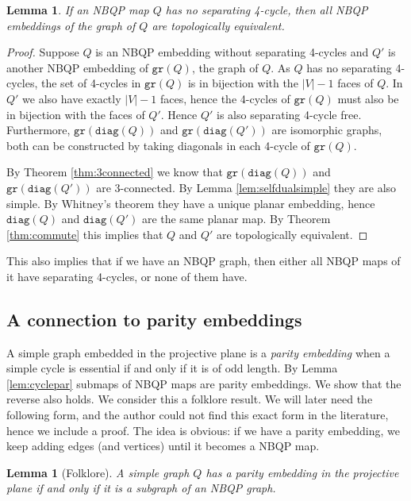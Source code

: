 \documentclass[10pt,a4paper]{article}
\newtheorem{lemma}[theorem]{Lemma}
\newcommand{\diag}[0]{\mathtt{diag}}
\newcommand{\gr}{\mathtt{gr}}
\begin{document}
\begin{lemma}    \label{lem:uniquestrduality}
     If an NBQP map $Q$ has no separating 4-cycle, then all NBQP embeddings of the graph of $Q$ are topologically equivalent.
\end{lemma}
\begin{proof}
    Suppose $Q$ is an NBQP embedding without separating 4-cycles and $Q'$ is another NBQP embedding of $\gr(Q)$, the graph of $Q$. As $Q$ has no separating 4-cycles, the set of 4-cycles in $\gr(Q)$ is in bijection with the $|V|-1$ faces of $Q$. In $Q'$ we also have exactly $|V|-1$ faces, hence the 4-cycles of $\gr(Q)$ must also be in bijection with the faces of $Q'$. Hence $Q'$ is also separating 4-cycle free.  Furthermore,  $\gr(\diag(Q))$ and $\gr(\diag(Q'))$ are isomorphic graphs, both can be constructed by taking diagonals in each 4-cycle of $\gr(Q)$. 
    
     By Theorem \ref{thm:3connected} we know that $\gr(\diag(Q))$ and  $\gr(\diag(Q'))$ are 3-connected. By Lemma \ref{lem:selfdualsimple} they are also simple. By Whitney's theorem they have a unique planar embedding, hence $\diag(Q)$ and $\diag(Q')$ are the same planar map. By Theorem \ref{thm:commute} this implies that $Q$ and $Q'$ are topologically equivalent.


\end{proof}


This also implies that if we have an NBQP graph, then either all NBQP maps of it have separating 4-cycles, or none of them have.

\subsection{A connection to parity embeddings}

 A simple graph embedded in the projective plane is a \emph{parity embedding} when a simple cycle is essential if and only if it is of odd length. By Lemma \ref{lem:cyclepar}  submaps of NBQP maps are parity embeddings. We show that the reverse also holds. We consider this a folklore result. We will later need the following form, and the author could not find  this exact form in the literature, hence we include a proof. The idea is obvious: if we have a parity embedding, we keep adding edges (and vertices) until it becomes a NBQP map. 


\begin{lemma}[Folklore]\label{lem:eqmaxcases}
    A simple graph $Q$ has a parity embedding in the projective plane if and only if it is a subgraph of an NBQP graph.
\end{lemma}
\end{document}
